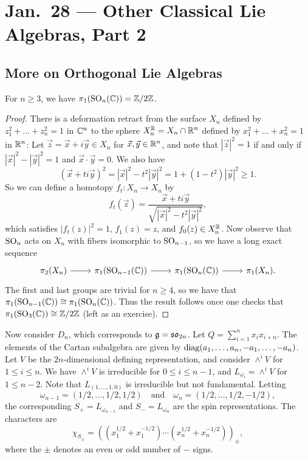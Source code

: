 \chapter{Jan.~28 --- Other Classical Lie Algebras, Part 2}

\section{More on Orthogonal Lie Algebras}

\begin{prop}
  For $n \ge 3$, we have
  $\pi_1(\operatorname{SO}_n(\mathbb{C})) = \mathbb{Z} / 2\mathbb{Z}$.
\end{prop}

\begin{proof}
  There is a deformation retract
  from the surface $X_n$ defined by
  $z_1^2 + \dots + z_n^2 = 1$
  in $\mathbb{C}^n$ to the
  sphere $X_n^{\mathbb{R}} = X_n \cap \mathbb{R}^n$
  defined by
  $x_1^2 + \dots + x_n^2 = 1$ in $\mathbb{R}^n$:
  Let $\vec{z} = \vec{x} + i \vec{y} \in X_n$ for $\vec{x}, \vec{y} \in \mathbb{R}^n$,
  and note that $|\vec{z}|^2 = 1$
  if and only if $|\vec{x}|^2 - |\vec{y}|^2 = 1$
  and $\vec{x} \cdot \vec{y} = 0$.
  We also have
  \[
    (\vec{x} + t i \vec{y})^2
    = |\vec{x}|^2 - t^2 |\vec{y}|^2
    = 1 + (1 - t^2) |\vec{y}|^2
    \ge 1.
  \]
  So we can define a homotopy
  $f_t : X_n \to X_n$ by
  \[
    f_t(\vec{z})
    = \frac{\vec{x} + t i \vec{y}}{\sqrt{|\vec{x}|^2 - t^2 |\vec{y}|^2}},
  \]
  which satisfies
  $|f_t(z)|^2 = 1$,
  $f_1(z) = z$, and $f_0(z) \in X_n^{\mathbb{R}}$.
  Now observe that $\operatorname{SO}_n$ acts on
  $X_n$ with fibers isomorphic
  to $\operatorname{SO}_{n - 1}$, so we have a
  long exact sequence
  \[
    \begin{tikzcd}
      \pi_2(X_n)
      \ar[r] & \pi_1(\SO_{n - 1}(\C))
      \ar[r] & \pi_1(\SO_n(\C))
      \ar[r] & \pi_1(X_n).
    \end{tikzcd}
  \]
  The first and last
  groups are trivial for $n \ge 4$,
  so we have
  that $\pi_1(\operatorname{SO}_{n - 1}(\mathbb{C})) \cong \pi_1(\operatorname{SO}_n(\mathbb{C}))$.
  Thus the result follows once one
  checks that
  $\pi_1(\operatorname{SO}_3(\mathbb{C})) \cong \mathbb{Z} / 2\mathbb{Z}$
  (left as an exercise).
\end{proof}

\begin{remark}
  Now consider $D_n$, which
  corresponds to $\mathfrak{g} = \mathfrak{so}_{2n}$.
  Let $Q = \sum_{i = 1}^n x_i x_{i + n}$.
  The elements of the Cartan
  subalgebra are given by
  $\operatorname{diag}(a_1, \dots, a_n, -a_1, \dots, -a_n)$.
  Let $V$ be the $2n$-dimensional
  defining representation,
  and consider $\wedge^i V$ for
  $1 \le i \le n$. We have $\wedge^i V$
  is irreducible for
  $0 \le i \le n - 1$, and $L_{\omega_i} = \wedge^i V$
  for $1 \le n - 2$. Note
  that $L_{(1, \dots, 1, 0)}$
  is irreducible but not fundamental.
  Letting
  \[
    \omega_{n - 1}
    = (1 / 2, \dots, 1 / 2, 1 / 2)
    \quad \text{and} \quad
    \omega_n = (1 / 2, \dots, 1 / 2, -1 / 2),
  \]
  the corresponding
  $S_+ = L_{\omega_{n - 1}}$
  and $S_- = L_{\omega_n}$
  are the spin representations.
  The characters are
  \[
    \chi_{S_{\pm}}
    = ((x_1^{1 / 2} + x_1^{-1 / 2})\cdots (x_n^{1 / 2} + x_n^{-1 / 2}))_{\pm},
  \]
  where the $\pm$ denotes an even or
  odd number of $-$ signs.
\end{remark}

